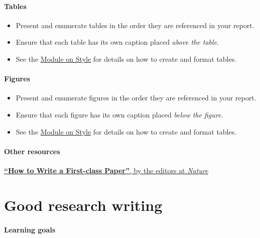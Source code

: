 \documentclass[]{book}
\begin{document}
\hypertarget{tables-1}{%
\subsubsection*{Tables}\label{tables-1}}

\begin{itemize}
\item
  Present and enumerate tables in the order they are referenced in your report.
\item
  Ensure that each table has its own caption placed \emph{above the table}.
\item
  See the \protect\hyperlink{style}{Module on Style} for details on how to create and format tables.
\end{itemize}

\hypertarget{figures}{%
\subsubsection*{Figures}\label{figures}}

\begin{itemize}
\item
  Present and enumerate figures in the order they are referenced in your report.
\item
  Ensure that each figure has its own caption placed \emph{below the figure}.
\item
  See the \protect\hyperlink{style}{Module on Style} for details on how to create and format tables.
\end{itemize}

\hypertarget{other-resources-3}{%
\subsubsection*{Other resources}\label{other-resources-3}}

\href{https://www.nature.com/articles/d41586-018-02404-4}{\textbf{``How to Write a First-class Paper''}, by the editors at \emph{Nature}}

\hypertarget{style}{%
\chapter{Good research writing}\label{style}}

\hypertarget{learning-goals-27}{%
\subsubsection*{Learning goals}\label{learning-goals-27}}
\end{document}
